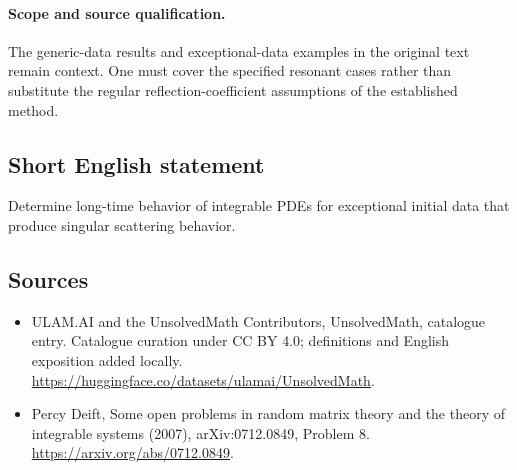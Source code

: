 \documentclass[11pt]{article}
\begin{document}
\paragraph{Scope and source qualification.}The generic-data results and exceptional-data examples in the original text remain context. One must cover the specified resonant cases rather than substitute the regular reflection-coefficient assumptions of the established method.
\subsection{Short English statement}
Determine long-time behavior of integrable PDEs for exceptional initial data that produce singular scattering behavior.
\subsection{Sources}
\begin{itemize}
\item[\hypertarget{source:statement:1}{S1}] ULAM.AI and the UnsolvedMath Contributors, UnsolvedMath, catalogue entry. Catalogue curation under CC BY 4.0; definitions and English exposition added locally.
\url{https://huggingface.co/datasets/ulamai/UnsolvedMath}.
\item[\hypertarget{source:statement:2}{S2}] Percy Deift, Some open problems in random matrix theory and the theory of integrable systems (2007), arXiv:0712.0849, Problem 8.
\url{https://arxiv.org/abs/0712.0849}.
\end{itemize}
\label{end:statement}
\end{document}
